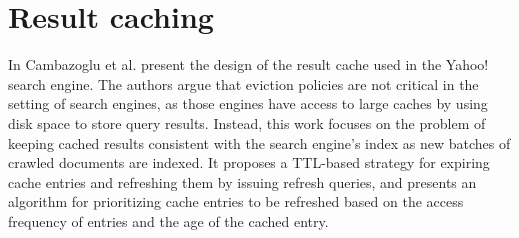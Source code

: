 
\section{Result caching}
\label{sec:caching}
In \cite{cambazoglu:yahoorefreshing} Cambazoglu et al. present the design of the result cache used
in the Yahoo! search engine.
The authors argue that eviction policies are not critical in the setting of search engines, as those engines have access
to large caches by using disk space to store query results.
Instead, this work focuses on the problem of keeping cached results consistent with the search engine’s index
as new batches of crawled documents are indexed.
It proposes a TTL-based strategy for expiring cache entries and refreshing them by issuing refresh queries,
and presents an algorithm for prioritizing cache entries to be refreshed based on the access frequency of entries and
the age of the cached entry.

